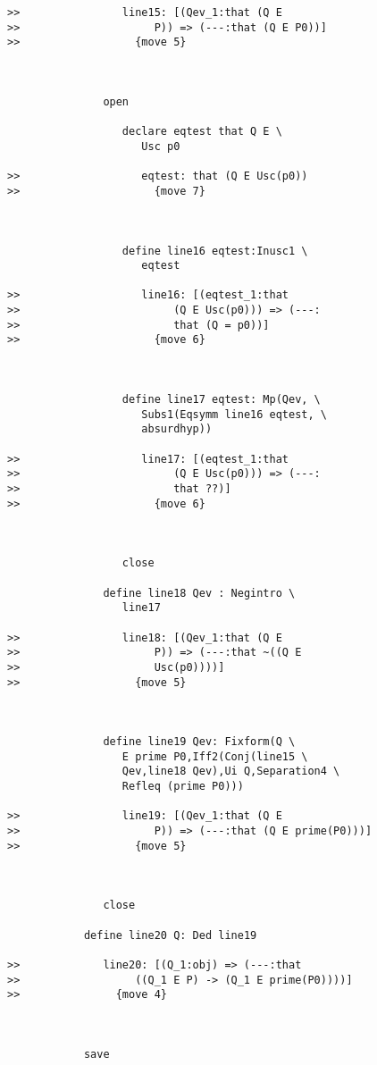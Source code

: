 \documentclass[12pt]{article}
\begin{document}
\begin{verbatim}
>>                line15: [(Qev_1:that (Q E
>>                     P)) => (---:that (Q E P0))]
>>                  {move 5}



               open

                  declare eqtest that Q E \
                     Usc p0

>>                   eqtest: that (Q E Usc(p0))
>>                     {move 7}



                  define line16 eqtest:Inusc1 \
                     eqtest

>>                   line16: [(eqtest_1:that
>>                        (Q E Usc(p0))) => (---:
>>                        that (Q = p0))]
>>                     {move 6}



                  define line17 eqtest: Mp(Qev, \
                     Subs1(Eqsymm line16 eqtest, \
                     absurdhyp))

>>                   line17: [(eqtest_1:that
>>                        (Q E Usc(p0))) => (---:
>>                        that ??)]
>>                     {move 6}



                  close

               define line18 Qev : Negintro \
                  line17

>>                line18: [(Qev_1:that (Q E
>>                     P)) => (---:that ~((Q E
>>                     Usc(p0))))]
>>                  {move 5}



               define line19 Qev: Fixform(Q \
                  E prime P0,Iff2(Conj(line15 \
                  Qev,line18 Qev),Ui Q,Separation4 \
                  Refleq (prime P0)))

>>                line19: [(Qev_1:that (Q E
>>                     P)) => (---:that (Q E prime(P0)))]
>>                  {move 5}



               close

            define line20 Q: Ded line19

>>             line20: [(Q_1:obj) => (---:that
>>                  ((Q_1 E P) -> (Q_1 E prime(P0))))]
>>               {move 4}



            save


\end{verbatim}
\end{document}

